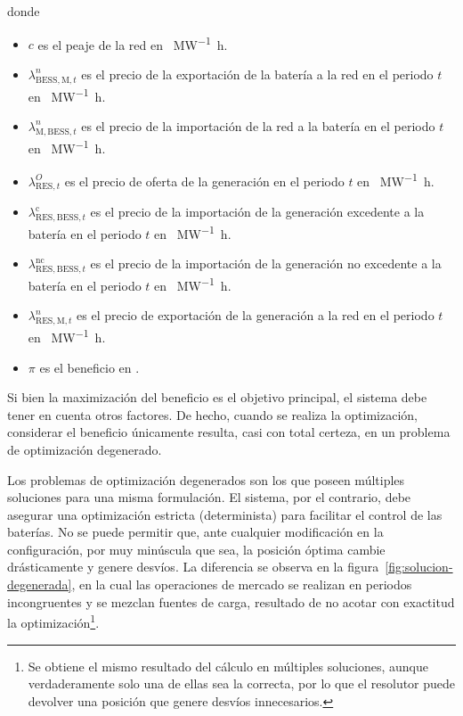 donde

\begin{itemize}

  \item \( c \) es el peaje de la red en \si{\text{\euro}\per\mega\watt\hour}.

  \item \( \lambda^{n}_{\text{BESS}, \text{M}, t} \) es el precio de la exportación de la batería a la red en el periodo \( t \) en \si{\text{\euro}\per\mega\watt\hour}.

  \item \( \lambda^{n}_{\text{M}, \text{BESS}, t}\) es el precio de la importación de la red a la batería en el periodo \( t \) en \si{\text{\euro}\per\mega\watt\hour}.

  \item \( \lambda^{O}_{\text{RES}, t} \) es el precio de oferta de la generación en el periodo \( t \) en \si{\text{\euro}\per\mega\watt\hour}.

  \item \( \lambda^{\text{c}}_{\text{RES}, \text{BESS}, t} \) es el precio de la importación de la generación excedente a la batería en el periodo \( t \) en \si{\text{\euro}\per\mega\watt\hour}.

  \item \( \lambda^{\text{nc}}_{\text{RES}, \text{BESS}, t} \) es el precio de la importación de la generación no excedente a la batería en el periodo \( t \) en \si{\text{\euro}\per\mega\watt\hour}.

  \item \( \lambda^{n}_{\text{RES}, \text{M}, t} \) es el precio de exportación de la generación a la red en el periodo \( t \) en \si{\text{\euro}\per\mega\watt\hour}.

  \item \( \pi \) es el beneficio en \si{\text{\euro}}.

\end{itemize}

Si bien la maximización del beneficio es el objetivo principal, el sistema debe tener en cuenta otros factores. De hecho, cuando se realiza la optimización, considerar el beneficio únicamente resulta, casi con total certeza, en un problema de optimización degenerado.

Los problemas de optimización degenerados son los que poseen múltiples soluciones para una misma formulación. El sistema, por el contrario, debe asegurar una optimización estricta (determinista) para facilitar el control de las baterías. No se puede permitir que, ante cualquier modificación en la configuración, por muy minúscula que sea, la posición óptima cambie drásticamente y genere desvíos. La diferencia se observa en la figura~\ref{fig:solucion-degenerada}, en la cual las operaciones de mercado se realizan en periodos incongruentes y se mezclan fuentes de carga, resultado de no acotar con exactitud la optimización\footnote{Se obtiene el mismo resultado del cálculo en múltiples soluciones, aunque verdaderamente solo una de ellas sea la correcta, por lo que el resolutor puede devolver una posición que genere desvíos innecesarios.}.

